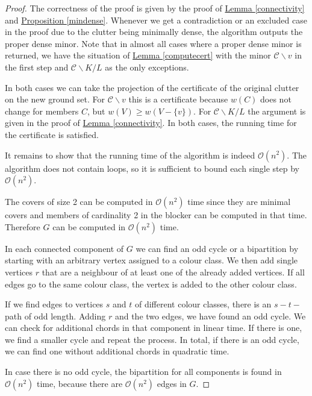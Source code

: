\documentclass[a4paper, 12pt, twoside=false]{scrbook}
\theoremstyle{definition}
\begin{document}
   \begin{proof}
       The correctness of the proof is given by the proof of \hyperref[connectivity]{Lemma \ref*{connectivity}} and \hyperref[mindense]{Proposition \ref*{mindense}}.
       Whenever we get a contradiction or an excluded case in the proof due to the clutter being minimally dense, the algorithm outputs the proper dense minor.
       Note that in almost all cases where a proper dense minor is returned, we have the situation of \hyperref[computecert]{Lemma \ref*{computecert}} with the minor $\mathcal{C}\backslash v$ in the first step and $\mathcal{C} \backslash K / L$ as the only exceptions.

       In both cases we can take the projection of the certificate of the original clutter on the new ground set.
       For $\mathcal{C} \backslash v$ this is a certificate because $w(C)$ does not change for members $C$, but $w(V) \geq w(V-\{v\})$.
       For $\mathcal{C} \backslash K / L$ the argument is given in the proof of \hyperref[connectivity]{Lemma \ref*{connectivity}}.
       In both cases, the running time for the certificate is satisfied.

       It remains to show that the running time of the algorithm is indeed $\mathcal{O}(n^2)$.
       The algorithm does not contain loops, so it is sufficient to bound each single step by $\mathcal{O}(n^2)$.

       The covers of size 2 can be computed in $\mathcal{O}(n^2)$ time since they are minimal covers and members of cardinality 2 in the blocker can be computed in that time.
       Therefore $G$ can be computed in $\mathcal{O}(n^2)$ time.

       In each connected component of $G$ we can find an odd cycle or a bipartition by starting with an arbitrary vertex assigned to a colour class. We then add single vertices $r$ that are a neighbour of at least one of the already added vertices. If all edges go to the same colour class, the vertex is added to the other colour class.

       If we find edges to vertices $s$ and $t$ of different colour classes, there is an $s-t-$path of odd length. Adding $r$ and the two edges, we have found an odd cycle. We can check for additional chords in that component in linear time. If there is one, we find a smaller cycle and repeat the process. In total, if there is an odd cycle, we can find one without additional chords in quadratic time.

       In case there is no odd cycle, the bipartition for all components is found in $\mathcal{O}(n^2)$ time, because there are $\mathcal{O}(n^2)$ edges in $G$.


\end{proof}
\end{document}
